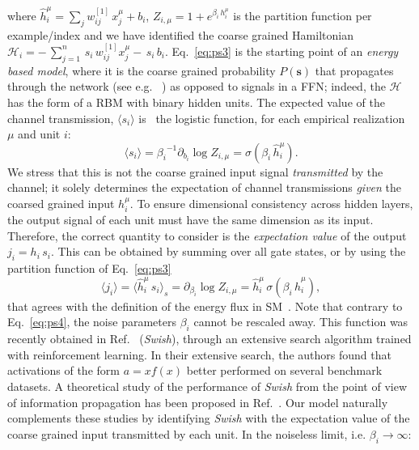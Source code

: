 \documentclass{article}
\begin{document}
%
where $\hat{h}^{\mu}_i = \sum_{j} w^{[1]}_{ij} \, x^{\mu}_j + b_i $,   $Z_{i, \mu}= 1+ e^{\beta_i \, h^{\mu}_i}$ is the partition function per example/index and we have identified the coarse grained Hamiltonian $\mathscr{H}_i = -  \, \sum_{j=1}^n \, s_i \, w^{[1]}_{ij} x^{\mu}_j -  \, s_i \, b_i$. Eq.~\eqref{eq:ps3} is the starting point of an {\it energy based model}, where it is the coarse grained probability $P(\mathbf{s})$ that propagates through the network (see e.g.~\cite{connie} ) as opposed to signals in a FFN; indeed, the $\mathscr{H}$ has the form of a RBM with binary hidden units. The expected value of the channel transmission, $\langle s_i \rangle$ is~\cite{hertz} the logistic function, for each empirical realization $\mu$ and unit $i$:
%
\begin{equation} \label{eq:ps4}
\langle s_i \rangle = {\beta_i}^{-1} \partial_{b_i} \log Z_{i, \mu} =  \sigma(\beta_i \, \hat{h}^{\mu}_i).
\end{equation}
%
We stress that this is not the coarse grained input signal {\it transmitted} by the channel; it solely determines the expectation of channel transmissions {\it given} the coarsed grained input $h_i^{\mu}$. To ensure dimensional consistency across hidden layers, the output signal of each unit must have the same dimension as its input. Therefore, the correct quantity to consider is the {\it expectation value} of the output $j_i = h_i \, s_i $.  This can be  obtained by summing over all gate states, or by using the partition function of Eq.~\eqref{eq:ps3}
%
\begin{equation} \label{eq:ps5}
\langle j_i \rangle = \langle \hat{h}_i^{\mu} \, s_i \rangle_s = \partial_{\beta_i} \log{Z_{i,\mu}} = \hat{h}^{\mu}_i \, \sigma(\beta_i \, \hat{h}^{\mu}_i),
\end{equation}
%
that agrees with the definition of the energy flux in SM~\cite{bellac}. Note that contrary to Eq.~\eqref{eq:ps4}, the noise parameters $\beta_i$ cannot be rescaled away. This function was recently obtained in Ref.~\cite{prajit} ({\it Swish}), through an extensive search algorithm trained with reinforcement learning. In their extensive search, the authors found that activations of the form $a = x f(x)$  better performed on several benchmark datasets. A theoretical study of the performance of {\it Swish} from the point of view of information propagation has been proposed in Ref.~\cite{soufiane}.  Our model naturally complements these studies by identifying {\it Swish} with the expectation value of the coarse grained input transmitted by each unit. In the noiseless limit, i.e. $\beta_i \to \infty $:
\end{document}
